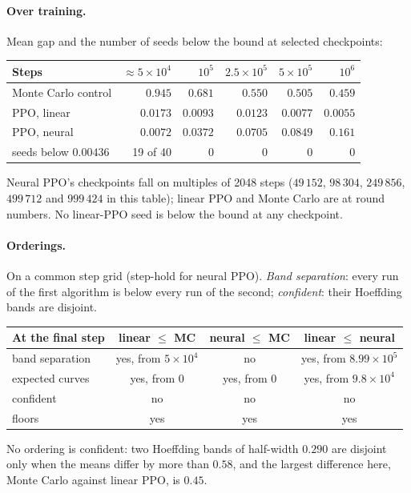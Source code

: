 \documentclass[11pt]{article}
\begin{document}
\paragraph{Over training.} Mean gap and the number of seeds below the bound at selected checkpoints:
\begin{center}
  \begin{tabular}{@{}lrrrrr@{}}
    \toprule
    Steps & $\approx 5 \times 10^4$ & $10^5$ & $2.5 \times 10^5$ & $5 \times 10^5$ & $10^6$ \\
    \midrule
    Monte Carlo control & $0.945$ & $0.681$ & $0.550$ & $0.505$ & $0.459$ \\
    PPO, linear & $0.0173$ & $0.0093$ & $0.0123$ & $0.0077$ & $0.0055$ \\
    PPO, neural & $0.0072$ & $0.0372$ & $0.0705$ & $0.0849$ & $0.161$ \\
    \quad seeds below $0.00436$ & 19 of 40 & 0 & 0 & 0 & 0 \\
    \bottomrule
  \end{tabular}
\end{center}
Neural PPO's checkpoints fall on multiples of 2048 steps ($49\,152$, $98\,304$, $249\,856$,
$499\,712$ and $999\,424$ in this table); linear PPO and Monte Carlo are at round numbers. No
linear-PPO seed is below the bound at any checkpoint.

\paragraph{Orderings.} On a common step grid (step-hold for neural PPO). \emph{Band separation}: every
run of the first algorithm is below every run of the second; \emph{confident}: their Hoeffding bands
are disjoint.
\begin{center}
  \begin{tabular}{@{}lccc@{}}
    \toprule
    At the final step & linear $\le$ MC & neural $\le$ MC & linear $\le$ neural \\
    \midrule
    band separation & yes, from $5 \times 10^4$ & no & yes, from $8.99 \times 10^5$ \\
    expected curves & yes, from 0 & yes, from 0 & yes, from $9.8 \times 10^4$ \\
    confident & no & no & no \\
    floors & yes & yes & yes \\
    \bottomrule
  \end{tabular}
\end{center}
No ordering is confident: two Hoeffding bands of half-width $0.290$ are disjoint only when the means
differ by more than $0.58$, and the largest difference here, Monte Carlo against linear PPO, is
$0.45$.
\end{document}
